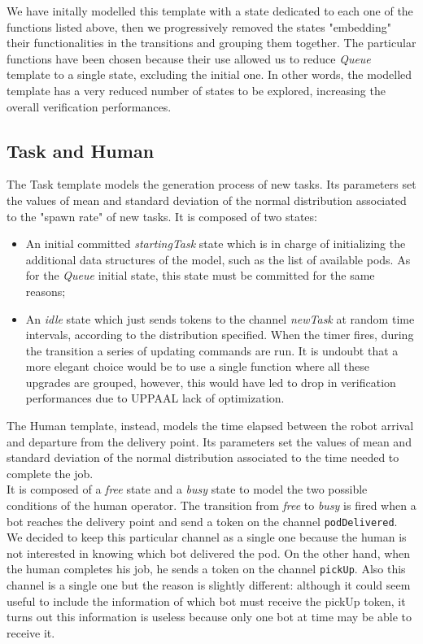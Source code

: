 \documentclass{article}
\begin{document}
			We have initally modelled this template with a state dedicated to each one of the functions listed above, then we progressively removed the states "embedding" their functionalities in the transitions and grouping them together. The particular functions have been chosen because their use allowed us to reduce \emph{Queue} template to a single state, excluding the initial one. In other words, the modelled template has a very reduced number of states to be explored, increasing the overall verification performances.
		
		\subsection{Task and Human}
			\label{sub:TaskAndHuman}
			The Task template models the generation process of new tasks. Its parameters set the values of mean and standard deviation of the normal distribution associated to the "spawn rate" of new tasks.
			It is composed of two states:
			\begin{itemize}
				\item An initial committed \emph{startingTask} state which is in charge of initializing the additional data structures of the model, such as the list of available pods. As for the \emph{Queue} initial state, this state must be committed for the same reasons;
				\item An \emph{idle} state which just sends tokens to the channel \emph{newTask} at random time intervals, according to the distribution specified. When the timer fires, during the transition a series of updating commands are run. It is undoubt that a more elegant choice would be to use a single function where all these upgrades are grouped, however, this would have led to drop in verification performances due to UPPAAL lack of optimization.
			\end{itemize}
			The Human template, instead, models the time elapsed between the robot arrival and departure from the delivery point. Its parameters set the values of mean and standard deviation of the normal distribution associated to the time needed to complete the job.\\
			It is composed of a \emph{free} state and a \emph{busy} state to model the two possible conditions of the human operator. The transition from \emph{free} to \emph{busy} is fired when a bot reaches the delivery point and send a token on the channel \verb|podDelivered|. We decided to keep this particular channel as a single one because the human is not interested in knowing which bot delivered the pod. On the other hand, when the human completes his job, he sends a token on the channel \verb|pickUp|. Also this channel is a single one but the reason is slightly different: although it could seem useful to include the information of which bot must receive the pickUp token, it turns out this information is useless because only one bot at time may be able to receive it.\\
\end{document}
